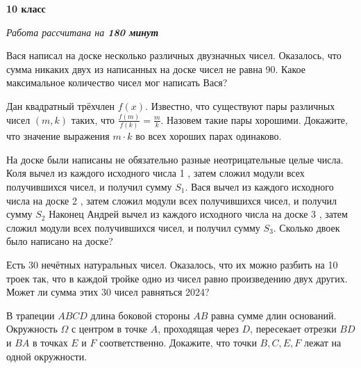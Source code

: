 \centerline{\bf \huge 10 класс}
\centerline{\normalsize{\it Работа рассчитана на \bf{180} минут}}

Вася написал на доске несколько различных двузначных чисел. Оказалось, что сумма никаких двух из написанных на доске чисел не равна 90. Какое максимальное количество чисел мог написать Вася?

Дан квадратный трёхчлен $f(x)$. Известно, что существуют пары различных чисел $(m, k)$ таких, что $\frac{f(m)}{f(k)}=\frac{m}{k}$. Назовем такие пары хорошими. Докажите, что значение выражения $m \cdot k$ во всех хороших парах одинаково.

На доске были написаны не обязательно разные неотрицательные целые числа. Коля вычел из каждого исходного числа 1 , затем сложил модули всех получившихся чисел, и получил сумму $S_1$. Вася вычел из каждого исходного числа на доске 2 , затем сложил модули всех получившихся чисел, и получил сумму $S_2$ Наконец Андрей вычел из каждого исходного числа на доске 3 , затем сложил модули всех получившихся чисел, и получил сумму $S_3$. Сколько двоек было написано на доске?

Есть 30 нечётных натуральных чисел. Оказалось, что их можно разбить на 10 троек так, что в каждой тройке одно из чисел равно произведению двух других. Может ли сумма этих 30 чисел равняться 2024?

В трапеции $A B C D$ длина боковой стороны $A B$ равна сумме длин оснований. Окружность $\Omega$ с центром в точке $A$, проходящая через $D$, пересекает отрезки $B D$ и $B A$ в точках $E$ и $F$ соответственно. Докажите, что точки $B, C, E, F$ лежат на одной окружности.